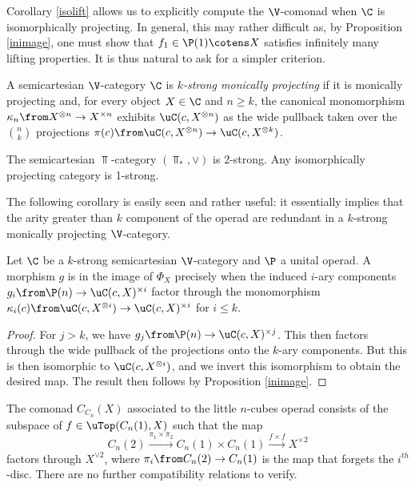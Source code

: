 \documentclass{tac}
\def\bTop{{\Top_\ast}}
\begin{document}
Corollary \ref{isolift} allows us to explicitly compute the $\V$-comonad when $\C$ is isomorphically projecting. In general, this may rather difficult as, by Proposition \ref{inimage}, one must show that $f_1 \in \P(1)\cotens X$ satisfies infinitely many lifting properties.  It is thus natural to ask for a simpler criterion.
\begin{definition}
   A semicartesian $\V$-category $\C$ is \emph{$k$-strong monically projecting} if  it is monically projecting and, for every object $X \in \C$ and $n \ge k$, the canonical monomorphism $\kappa_n \from X^{\otimes n} \to X^{\times n}$ exhibits $\uC(c, X^{\otimes n})$ as the wide pullback taken over the ${n}\choose{k}$ projections $\pi(c) \from \uC(c, X^{\otimes n}) \to \uC(c, X^{\otimes k})$.
\end{definition}
\begin{example}
    The semicartesian $\Top$-category $(\bTop, \vee)$ is 2-strong. Any isomorphically projecting category is 1-strong. 
\end{example}
The following corollary is easily seen and rather useful: it essentially implies that the arity greater than $k$ component of the operad are redundant in a $k$-strong monically projecting $\V$-category. 
\begin{corollary}
    Let $\C$ be a $k$-strong semicartesian $\V$-category and $\P$ a unital operad. A morphism $g$ is in the image of $\Phi_X$ precisely when the induced $i$-ary components $g_i \from \P(n) \to \uC(c, X)^{\times i}$ factor through the monomorphism $\kappa_i(c) \from \uC(c, X^{\otimes i}) \to \uC(c, X)^{\times i}$ for $i\leq k.$
\end{corollary}
\begin{proof}
    For $j > k$, we have $g_j \from  \P(n) \to \uC(c, X)^{\times j}$. This then factors through the wide pullback of the projections onto the $k$-ary components. But this is then isomorphic to $\uC(c, X^{\otimes i})$, and we invert this isomorphism to obtain the desired map. The result then follows by Proposition \ref{inimage}.
\end{proof}
\begin{example}
    The comonad $C_{C_n}(X)$ associated to the little $n$-cubes operad consists of the subspace of $ f\in \uTop(C_n(1), X)$ such that the map 
    $$
    C_n(2) \xrightarrow{\pi_1 \times \pi_2} C_n(1)\times C_n(1) \xrightarrow{f\times f } X^{\times 2}
    $$
    factors through $X^{\vee 2}$, where $\pi_i \from C_n(2) \to C_n(1)$ is the map that forgets the $i^{th}$-disc. There are no further compatibility relations to verify.
\end{example}
\end{document}
